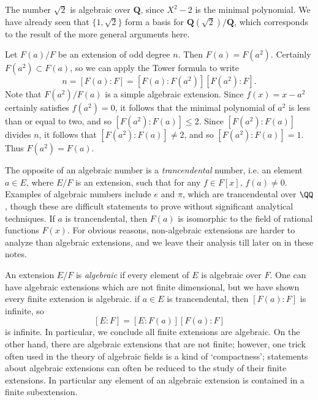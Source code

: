 \begin{example}
	The number $\sqrt{2}$ is algebraic over $\mathbf{Q}$, since $X^2 - 2$ is the minimal polynomial. We have already seen that $\{ 1, \sqrt{2} \}$ form a basis for $\mathbf{Q}(\sqrt{2})/\mathbf{Q}$, which corresponds to the result of the more general arguments here.
\end{example}

\begin{example}
	Let $F(a)/F$ be an extension of odd degree $n$. Then $F(a) = F(a^2)$. Certainly $F(a^2) \subset F(a)$, so we can apply the Tower formula to write
	\[ n = [F(a): F] = [F(a): F(a^2)] [ F(a^2): F]. \]
	Note that $F(a^2) / F(a)$ is a simple algebraic extension. Since $f(x) = x - a^2$ certainly satisfies $f(a^2) = 0$, it follows that the minimal polynomial of $a^2$ is less than or equal to two, and so $[F(a^2): F(a)] \leq 2$. Since $[F(a^2): F(a)]$ divides $n$, it follows that $[F(a^2): F(a)] \neq 2$, and so $[F(a^2): F(a)] = 1$. Thus $F(a^2) = F(a)$.
\end{example}

\begin{remark}
	The opposite of an algebraic number is a {\it trancendental} number, i.e. an element $a \in E$, where $E/F$ is an extension, such that for any $f \in F[x]$, $f(a) \neq 0$. Examples of algebraic numbers include $e$ and $\pi$, which are trancendental over $\QQ$, though these are difficult statements to prove without significant analytical techniques. If $a$ is trancendental, then $F(a)$ is isomorphic to the field of rational functions $F(x)$. For obvious reasons, non-algebraic extensions are harder to analyze than algebraic extensions, and we leave their analysis till later on in these notes.
\end{remark}

An extension $E/F$ is {\it algebraic} if every element of $E$ is algebraic over $F$. One can have algebraic extensions which are not finite dimensional, but we have shown every finite extension is algebraic. if $a \in E$ is trancendental, then $[F(a): F]$ is infinite, so
%
\[ [E:F] = [E:F(a)][F(a):F] \]
%
is infinite. In particular, we conclude all finite extensions are algebraic. On the other hand, there are algebraic extensions that are not finite; however, one trick often used in the theory of algebraic fields is a kind of `compactness'; statements about algebraic extensions can often be reduced to the study of their finite extensions. In particular any element of an algebraic extension is contained in a finite subextension.

